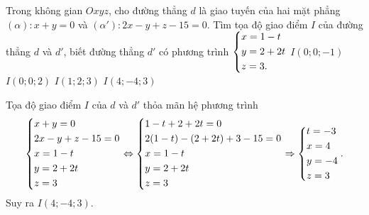 \begin{ex}%
	Trong không gian $Oxyz$, cho đường thẳng $d$ là giao tuyến của hai mặt phẳng $(\alpha) \colon x+y=0$ và $(\alpha ') \colon 2x-y+z-15=0$. Tìm tọa độ giao điểm $I$ của đường thẳng $d$ và $d'$, biết đường thẳng $d'$ có phương trình $\left\{\begin{aligned}& x=1-t\\&y=2+2t\\&z=3.\end{aligned}\right.$
	\choice
	{$I(0;0;-1)$}
	{$I(0;0;2)$}
	{$I(1;2;3)$}
	{\True$ I(4;-4;3)$}
	\loigiai
	{ Tọa độ giao điểm $I$ của $d$ và $d'$ thỏa mãn hệ phương trình $$\left\{\begin{aligned}&x+y=0\\&2x-y+z-15 =0\\& x=1-t\\&y=2+2t\\&z=3\end{aligned}\right. \Leftrightarrow \left\{\begin{aligned}&1-t+2+2t=0\\& 2(1-t)-(2+2t)+3-15=0\\&x=1-t\\&y=2+2t\\&z=3\end{aligned}\right. \Rightarrow \left\{\begin{aligned}&t=-3\\&x=4\\&y=-4\\&z=3\end{aligned}\right..$$ Suy ra $ I(4;-4;3)$.
		
	}
\end{ex}

